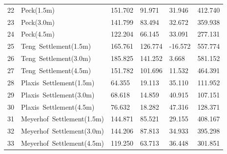\begin{tabularx}{\textwidth}{ | l | p{} | X | X | X | X | }
\hline
 22 & \mbox{Peck(1.5m)} & 151.702 & 91.971 & 31.946 & 412.740 \\
 23 & \mbox{Peck(3.0m)} & 141.799 & 83.494 & 32.672 & 359.938 \\
 24 & \mbox{Peck(4.5m)} & 122.204 & 66.145 & 33.091 & 277.131 \\
\hline
 25 & \mbox{Teng Settlement(1.5m)} & 165.761 & 126.774 & -16.572 & 557.774 \\
 26 & \mbox{Teng Settlement(3.0m)} & 185.825 & 141.252 & 3.668 & 581.152 \\
 27 & \mbox{Teng Settlement(4.5m)} & 151.782 & 101.696 & 11.532 & 464.391 \\
\hline
 28 & \mbox{Plaxis Settlement(1.5m)} & 64.355 & 19.113 & 35.110 & 111.952 \\
 29 & \mbox{Plaxis Settlement(3.0m)} & 68.618 & 14.859 & 40.915 & 107.151 \\
 30 & \mbox{Plaxis Settlement(4.5m)} & 76.632 & 18.282 & 47.316 & 128.371 \\
\hline
 31 & \mbox{Meyerhof Settlement(1.5m)} & 144.871 & 85.521 & 29.155 & 408.167 \\
 32 & \mbox{Meyerhof Settlement(3.0m)} & 144.206 & 87.813 & 34.933 & 395.298 \\
 33 & \mbox{Meyerhof Settlement(4.5m)} & 119.250 & 63.713 & 36.448 & 301.851 \\
\hline
\end{tabularx}
